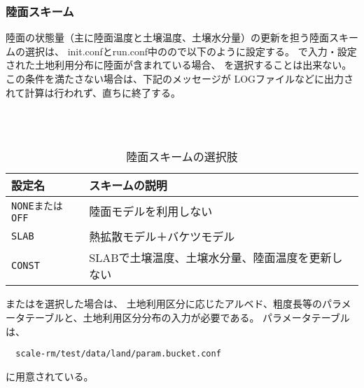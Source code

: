\subsubsection{陸面スキーム}
陸面の状態量（主に陸面温度と土壌温度、土壌水分量）の更新を担う陸面スキームの選択は、
init.confとrun.conf中のので以下のように設定する。
で入力・設定された土地利用分布に陸面が含まれている場合、
を選択することは出来ない。この条件を満たさない場合は、下記のメッセージが
LOGファイルなどに出力されて計算は行われず、直ちに終了する。

\\

\\

\begin{table}[h]
\begin{center}
  \caption{陸面スキームの選択肢}
  \label{tab:nml_land}
  \begin{tabularx}{150mm}{lX} \hline
    \rowcolor[gray]{0.9}  設定名 & スキームの説明 \\ \hline
      \verb|NONEまたはOFF| & 陸面モデルを利用しない                       \\
      \verb|SLAB|          & 熱拡散モデル＋バケツモデル                    \\
      \verb|CONST|         & SLABで土壌温度、土壌水分量、陸面温度を更新しない \\
    \hline
  \end{tabularx}
\end{center}
\end{table}

\vspace{\baselineskip}
またはを選択した場合は、
土地利用区分に応じたアルベド、粗度長等のパラメータテーブルと、土地利用区分分布の入力が必要である。
パラメータテーブルは、
\begin{verbatim}
  scale-rm/test/data/land/param.bucket.conf
\end{verbatim}
に用意されている。\\



